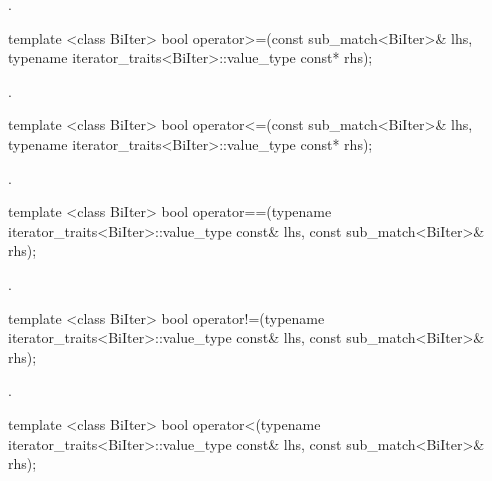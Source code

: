 \begin{itemdescr}
\pnum\returns  {}.
\end{itemdescr}

%
\begin{itemdecl}
template <class BiIter> 
  bool operator>=(const sub_match<BiIter>& lhs, 
                  typename iterator_traits<BiIter>::value_type const* rhs); 
\end{itemdecl}

\begin{itemdescr}
\pnum\returns  {}.
\end{itemdescr}

%
\begin{itemdecl}
template <class BiIter> 
  bool operator<=(const sub_match<BiIter>& lhs, 
                  typename iterator_traits<BiIter>::value_type const* rhs); 
\end{itemdecl}

\begin{itemdescr}
\pnum
\returns  {}.
\end{itemdescr}

%
\begin{itemdecl}
template <class BiIter> 
  bool operator==(typename iterator_traits<BiIter>::value_type const& lhs, 
                  const sub_match<BiIter>& rhs);
\end{itemdecl}

\begin{itemdescr}
\pnum
\returns {}.
\end{itemdescr}

%
\begin{itemdecl}
template <class BiIter> 
  bool operator!=(typename iterator_traits<BiIter>::value_type const& lhs, 
                  const sub_match<BiIter>& rhs); 
\end{itemdecl}

\begin{itemdescr}
\pnum
\returns {}.
\end{itemdescr}

%
\begin{itemdecl}
template <class BiIter> 
  bool operator<(typename iterator_traits<BiIter>::value_type const& lhs, 
                 const sub_match<BiIter>& rhs); 
\end{itemdecl}

